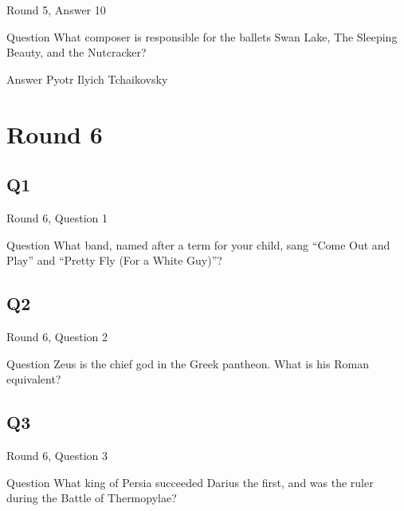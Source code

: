 \documentclass[11pt]{beamer}
\begin{document}
\begin{frame}[t]{Round 5, Answer 10}
\vspace{2em}
\begin{block}{Question}
What composer is responsible for the ballets Swan Lake, The Sleeping Beauty, and the Nutcracker\@?
\end{block}
\pause{}
\begin{block}{Answer}
Pyotr Ilyich Tchaikovsky
\end{block}
\end{frame}
    

\section{Round 6}
    

\subsection*{Q1}
\begin{frame}[t]{Round 6, Question 1}
\vspace{2em}
\begin{block}{Question}
What band, named after a term for your child, sang ``Come Out and Play'' and ``Pretty Fly (For a White Guy)''\@?
\end{block}
\end{frame}
    

\subsection*{Q2}
\begin{frame}[t]{Round 6, Question 2}
\vspace{2em}
\begin{block}{Question}
Zeus is the chief god in the Greek pantheon. What is his Roman equivalent\@?
\end{block}
\end{frame}
    

\subsection*{Q3}
\begin{frame}[t]{Round 6, Question 3}
\vspace{2em}
\begin{block}{Question}
What king of Persia succeeded Darius the first, and was the ruler during the Battle of Thermopylae\@?
\end{block}
\end{frame}
    
\end{document}
